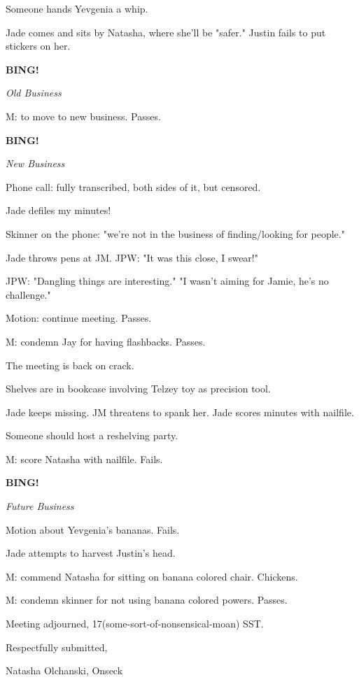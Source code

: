\documentclass[12pt]{article}
\newcommand{\bing}{{\bf BING!} }
\newcommand{\goto}[1]{\bing \vskip 12pt \centerline{{\em{#1}}}}
\begin{document}
Someone hands Yevgenia a whip.

Jade comes and sits by Natasha, where she'll be "safer." Justin fails to put stickers on her.

\goto{Old Business}

M: to move to new business. Passes.

\goto{New Business}

Phone call: fully transcribed, both sides of it, but censored.

Jade defiles my minutes!

Skinner on the phone: "we're not in the business of finding/looking for people."

Jade throws pens at JM. JPW: "It was this close, I swear!"

JPW: "Dangling things are interesting." "I wasn't aiming for Jamie, he's no challenge."

Motion: continue meeting. Passes.

M: condemn Jay for having flashbacks. Passes.

The meeting is back on crack.

Shelves are in bookcase involving Telzey toy as precision tool.

Jade keeps missing. JM threatens to spank her. Jade scores minutes with nailfile.

Someone should host a reshelving party.

M: score Natasha with nailfile. Fails.

\goto{Future Business}

Motion about Yevgenia's bananas. Fails.

Jade attempts to harvest Justin's head.

M: commend Natasha for sitting on banana colored chair. Chickens.

M: condemn skinner for not using banana colored powers. Passes.

\vspace{12pt}

\noindent
Meeting adjourned, 17(some-sort-of-nonsensical-moan) SST.

\vspace{18pt}

\centerline{Respectfully submitted,}
\centerline{Natasha Olchanski, Onseck}
\end{document}
